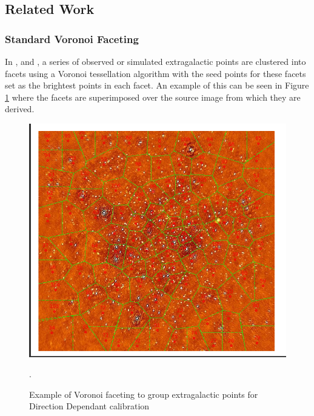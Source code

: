 \subsection{Related Work}\label{ra:sec:rw}
%
\subsubsection{Standard Voronoi Faceting}\label{ra:ssec:svf}
In \citep{tasse2014applying}, \citep{smirnov2015radio} and \citep{van2016lofar}, a series of observed or simulated extragalactic points are clustered into facets using a Voronoi tessellation algorithm with the seed points for these facets set as the brightest points in each facet. An example of this can be seen in Figure \ref{tes:fig:stelvor} where the facets are superimposed over the source image from which they are derived.
%
\begin{figure}[H]
    \centering
    \includegraphics[scale=0.4]{Images/tessellation.png}
    \caption{Example of Voronoi faceting to group extragalactic points for Direction Dependant calibration}.
    \label{tes:fig:stelvor}
\end{figure}
